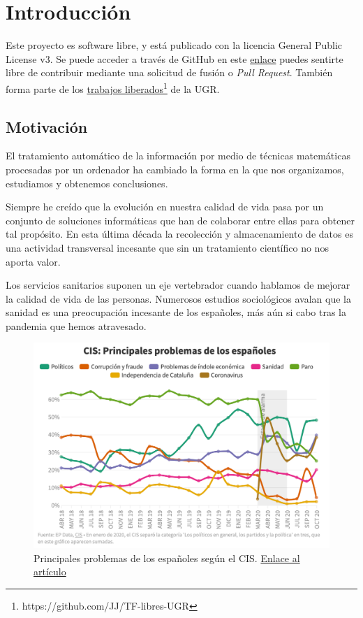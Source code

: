 \chapter{Introducción}
Este proyecto es software libre, y está publicado con la licencia \cite{gplv3} General Public License v3.
Se puede acceder a través de GitHub en este \href{https://github.com/pablojjimenez/TFG}{enlace} puedes sentirte libre de contribuir mediante una solicitud de fusión o \textit{Pull Request}. También forma parte de los \href{https://github.com/JJ/TF-libres-UGR}{trabajos liberados}\footnote{https://github.com/JJ/TF-libres-UGR} de la UGR.

\section{Motivación} 
El tratamiento automático de la información por medio de técnicas matemáticas procesadas por un ordenador ha cambiado la forma en la que nos organizamos, estudiamos y obtenemos conclusiones.

Siempre he creído que la evolución en nuestra calidad de vida pasa por un
conjunto de soluciones informáticas que han de colaborar entre ellas para obtener tal propósito. 
En esta última década la recolección y almacenamiento de datos es una actividad transversal incesante que sin un tratamiento científico no nos aporta valor. 

Los servicios sanitarios suponen un eje vertebrador cuando hablamos de mejorar la calidad de vida de las personas. Numerosos estudios sociológicos avalan que la sanidad es una preocupación incesante de los españoles, más aún si cabo tras la pandemia que hemos atravesado. 
\FloatBarrier
\begin{figure}[]
	\centering	
	\includegraphics[scale=0.5]{doc/logos/imgs/CIS_1.png}
	\caption{ 
        Principales problemas de los españoles según el CIS. \href{https://www.rtve.es/noticias/20201015/crisis-economica-coronavirus-preocupan-ahora-mas-espanoles-paro/2045610.shtml}{Enlace al artículo}
    }
    \label{fig:worst_f_value}
\end{figure}
\FloatBarrier

